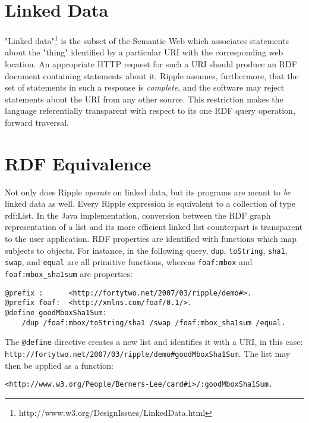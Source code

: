 \documentclass[runningheads]{llncs}
\begin{document}
\section{Linked Data}

"Linked data"\footnote{http://www.w3.org/DesignIssues/LinkedData.html} is the subset of the Semantic Web which associates statements about the "thing" identified by a particular URI with the corresponding web location.  An appropriate HTTP request for such a URI should produce an RDF document containing statements about it.  Ripple assumes, furthermore, that the set of statements in such a response is \emph{complete}, and the software may reject statements about the URI from any other source.  This restriction makes the language referentially transparent with respect to its one RDF query operation, forward traversal.

\section{RDF Equivalence}

Not only does Ripple \emph{operate} on linked data, but its programs are meant to \emph{be} linked data as well.  Every Ripple expression is equivalent to a collection of type rdf:List.  In the Java implementation, conversion between the RDF graph representation of a list and its more efficient linked list counterpart is transparent to the user application.  RDF properties are identified with functions which map subjects to objects.  For instance, in the following query, \texttt{dup}, \texttt{toString}, \texttt{sha1}, \texttt{swap}, and \texttt{equal} are all primitive functions, whereas \texttt{foaf:mbox} and \texttt{foaf:mbox\_sha1sum} are properties:

\begin{verbatim}
@prefix :      <http://fortytwo.net/2007/03/ripple/demo#>.
@prefix foaf:  <http://xmlns.com/foaf/0.1/>.
@define goodMboxSha1Sum:
    /dup /foaf:mbox/toString/sha1 /swap /foaf:mbox_sha1sum /equal.
\end{verbatim}

The \texttt{@define} directive creates a new list and identifies it with a URI, in this case:
\texttt{http://fortytwo.net/2007/03/ripple/demo\#goodMboxSha1Sum}.  The list may then be applied as a function:

\begin{verbatim}
<http://www.w3.org/People/Berners-Lee/card#i>/:goodMboxSha1Sum.
\end{verbatim}
\end{document}
